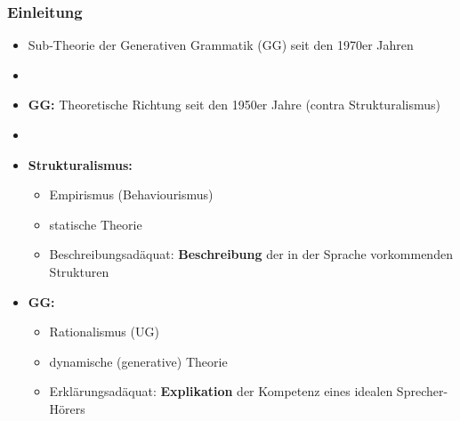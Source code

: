 \begin{frame}
\frametitle{Einleitung}

\begin{itemize}

	\item Sub-Theorie der Generativen Grammatik (GG) seit den 1970er Jahren \citep{Chomsky70a, Jackendoff77a}
	\item[]	
	\item \textbf{GG:} Theoretische Richtung seit den 1950er Jahre \citep{Chomsky57a} (contra Strukturalismus)
	\item[]
	\item \textbf{Strukturalismus:}
	\begin{itemize}
		\item Empirismus (Behaviourismus)
		\item statische Theorie
		\item Beschreibungsadäquat: \textbf{Beschreibung} der in der Sprache vorkommenden Strukturen
	\end{itemize}
	
	\item \textbf{GG:}
	\begin{itemize}
		\item Rationalismus (UG)
		\item dynamische (generative) Theorie
		\item Erklärungsadäquat: \textbf{Explikation} der Kompetenz eines idealen Sprecher-Hörers
	\end{itemize}

\end{itemize}

\end{frame}


